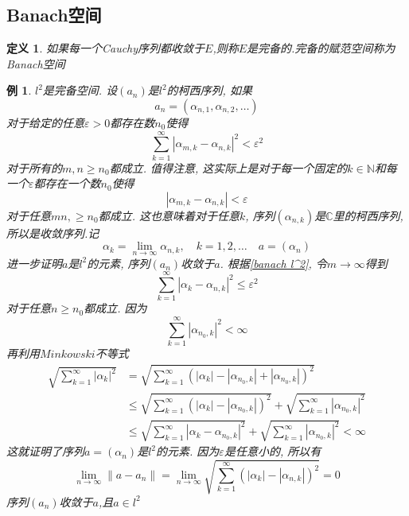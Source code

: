 \documentclass{book}
\newtheorem{definition}{\hspace{2em}定义}[section]
\newtheorem{example}{例}[section]
\begin{document}
\subsection*{Banach空间}
\begin{definition}
  如果每一个Cauchy序列都收敛于$E$,则称$E$是完备的.完备的赋范空间称为Banach空间
\end{definition}
\begin{example}\label{l^2 complete}
  $l^2$是完备空间. 设$(a_n)$是$l^2$的柯西序列, 如果
  \begin{equation*}
    a_n=(\alpha_{n,1},\alpha_{n,2},\dots)
  \end{equation*}
  对于给定的任意$\varepsilon>0$都存在数$n_0$使得
  \begin{equation*}\label{banach l^2}
    \sum_{k=1}^{\infty}|\alpha_{m,k}-\alpha_{n,k}|^2<\varepsilon^2
  \end{equation*}
  对于所有的$m,n\geq n_0$都成立. 值得注意, 这实际上是对于每一个固定的$k\in \mathbb{N}$和每一个$\varepsilon$都存在一个数$n_0$使得
  \begin{equation*}
    |\alpha_{m,k}-\alpha_{n,k}|<\varepsilon
  \end{equation*}
  对于任意$mn,\geq n_0$都成立. 这也意味着对于任意$k$, 序列$(\alpha_{n,k})$是$\mathbb{C}$里的柯西序列, 所以是收敛序列.记
  \begin{equation*}
    \alpha_k=\lim_{n\to\infty}\alpha_{n,k},\quad k=1,2,\dots\quad a=(\alpha_{n})
  \end{equation*}
  进一步证明$a$是$l^2$的元素, 序列$(a_n)$收敛于$a$. 根据\eqref{banach l^2}, 令$m\to \infty$得到
  \begin{equation*}
    \sum_{k=1}^{\infty}|\alpha_k-\alpha_{n,k}|^2\leq\varepsilon^2
  \end{equation*}
  对于任意$n\geq n_0$都成立. 因为
  \begin{equation*}
    \sum_{k=1}^{\infty}|\alpha_{n_0,k}|^2<\infty
  \end{equation*}
  再利用$Minkowski$不等式
  \begin{equation*}
  \begin{split}
     \sqrt{\sum_{k=1}^{\infty}|\alpha_k|^2}&=\sqrt{\sum_{k=1}^{\infty}(|\alpha_k|-|\alpha_{n_0,k}|+|\alpha_{n_0,k}|)^2} \\
       &\leq\sqrt{\sum_{k=1}^{\infty}(|\alpha_k|-|\alpha_{n_0,k}|)^2}+\sqrt{\sum_{k=1}^{\infty}|\alpha_{n_0,k}|^2}\\
       &\leq\sqrt{\sum_{k=1}^{\infty}|\alpha_k-\alpha_{n_0,k}|^2}+\sqrt{\sum_{k=1}^{\infty}|\alpha_{n_0,k}|^2}<\infty
  \end{split}
  \end{equation*}
  这就证明了序列$a=(\alpha_n)$是$l^2$的元素. 因为$\varepsilon$是任意小的, 所以有
  \begin{equation*}
    \lim_{n\to\infty}\|a-a_n\|=\lim_{n\to\infty}\sqrt{\sum_{k=1}^{\infty}(|\alpha_k|-|\alpha_{n,k}|)^2}=0
  \end{equation*}
  序列$(a_n)$收敛于$a$,且$a\in l^2$
\end{example}
\end{document}
